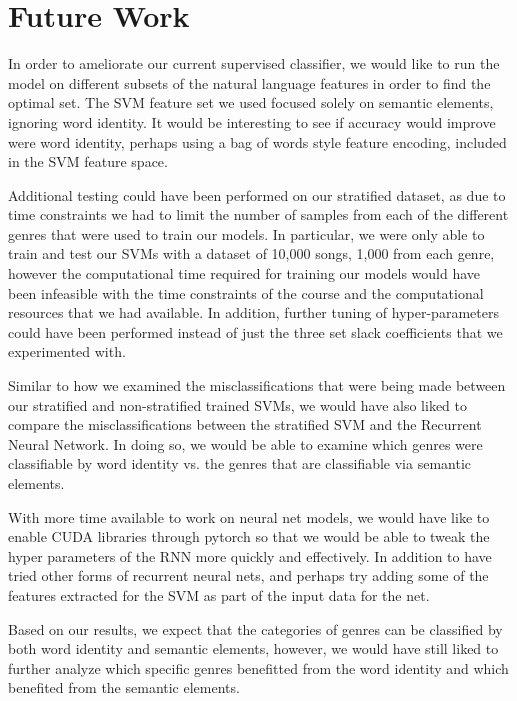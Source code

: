 \documentclass[journal]{IEEEtran}
\begin{document}
\section{Future Work}

In order to ameliorate our current supervised classifier, we would like to run the model on different subsets of the natural language features in order to find the optimal set. The SVM feature set we used focused solely on semantic elements, ignoring word identity. It would be interesting to see if accuracy would improve were word identity, perhaps using a bag of words style feature encoding, included in the SVM feature space.

Additional testing could have been performed on our stratified dataset, as due to time constraints we had to limit the number of samples from each of the different genres that were used to train our models. In particular, we were only able to train and test our SVMs with a dataset of 10,000 songs, 1,000 from each genre, however the computational time required for training our models would have been infeasible with the time constraints of the course and the computational resources that we had available. In addition, further tuning of hyper-parameters could have been performed instead of just the three set slack coefficients that we experimented with.

Similar to how we examined the misclassifications that were being made between our stratified and non-stratified trained SVMs, we would have also liked to compare the misclassifications between the stratified SVM and the Recurrent Neural Network. In doing so, we would be able to examine which genres were classifiable by word identity vs. the genres that are classifiable via semantic elements.

With more time available to work on neural net models, we would have like to enable CUDA libraries through pytorch so that we would be able to tweak the hyper parameters of the RNN more quickly and effectively. In addition to have tried other forms of recurrent neural nets, and perhaps try adding some of the features extracted for the SVM as part of the input data for the net. 

Based on our results, we expect that the categories of genres can be classified by both word identity and semantic elements, however, we would have still liked to further analyze which specific genres benefitted from the word identity and which benefited from the semantic elements.
\end{document}
